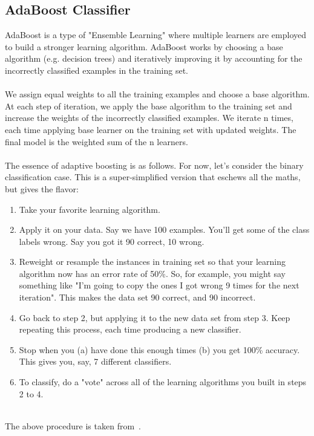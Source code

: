 \documentclass[10pt,a4paper]{article}
\begin{document}
\subsection{AdaBoost Classifier}
\textbf{}AdaBoost is a type of "Ensemble Learning" where multiple learners are employed to build a stronger learning algorithm. AdaBoost works by choosing a base algorithm (e.g. decision trees) and iteratively improving it by accounting for the incorrectly classified examples in the training set.\\\\
We assign equal weights to all the training examples and choose a base algorithm. At each step of iteration, we apply the base algorithm to the training set and increase the weights of the incorrectly classified examples. We iterate n times, each time applying base learner on the training set with updated weights. The final model is the weighted sum of the n learners.\\\\
The essence of adaptive boosting is as follows. For now, let's consider the binary classification case.  This is a super-simplified version that eschews all the maths, but gives the flavor:
\begin{enumerate}
    \item Take your favorite learning algorithm.
    \item Apply it on your data. Say we have 100 examples. You'll get some of the class labels wrong. Say you got it 90 correct, 10 wrong.
    \item Reweight or resample the instances in training set so that your learning algorithm now has an error rate of 50\%. So, for example, you might say something like "I'm going to copy the ones I got wrong 9 times for the next iteration". This makes the data set 90 correct, and 90 incorrect. 
    \item Go back to step 2, but applying it to the new data set from step 3. Keep repeating this process, each time producing a new classifier.
    \item Stop when you (a) have done this enough times (b) you get 100\% accuracy. This gives you, say, 7 different classifiers.
    \item To classify, do a "vote" across all of the learning algorithms you built in steps 2 to 4. 
\end{enumerate}\\
The above procedure is taken from~\cite{e}.
\end{document}
